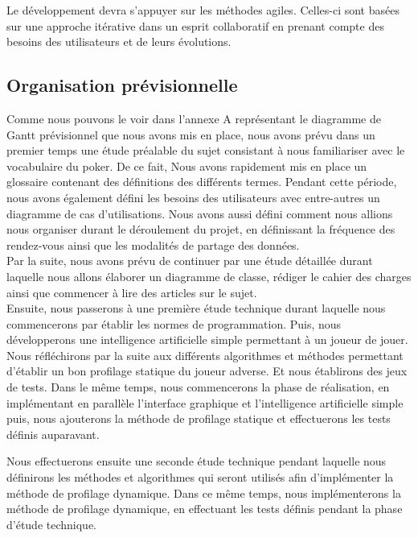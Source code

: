 \documentclass{report}
\begin{document}
Le développement devra s'appuyer sur les méthodes agiles. Celles-ci sont basées sur une approche itérative dans un esprit collaboratif en prenant compte des besoins des utilisateurs et de leurs évolutions.\par

\subsection{Organisation prévisionnelle}

\hspace{0.5cm}Comme nous pouvons le voir dans l'annexe A représentant le diagramme de Gantt prévisionnel que nous avons mis en place, nous avons prévu dans un premier temps une étude préalable du sujet consistant à nous familiariser avec le vocabulaire du poker. De ce fait, Nous avons rapidement mis en place un glossaire contenant des définitions des différents termes. Pendant cette période, nous avons également défini les besoins des utilisateurs avec entre-autres un diagramme de cas d'utilisations. Nous avons aussi défini comment nous allions nous organiser durant le déroulement du projet, en définissant la fréquence des rendez-vous ainsi que les modalités de partage des données.\\

Par la suite, nous avons prévu de continuer par une étude détaillée durant laquelle nous allons élaborer un diagramme de classe, rédiger le cahier des charges ainsi que commencer à lire des articles sur le sujet.\\

Ensuite, nous passerons à une première étude technique durant laquelle nous commencerons par établir les normes de programmation. Puis, nous développerons une intelligence artificielle simple permettant à un joueur de jouer. Nous réfléchirons par la suite aux différents algorithmes et méthodes permettant d'établir un bon profilage statique du joueur adverse. Et nous établirons des jeux de tests. Dans le même temps, nous commencerons la phase de réalisation, en implémentant en parallèle l'interface graphique et l'intelligence artificielle simple puis, nous ajouterons la méthode de profilage statique et effectuerons les tests définis auparavant.\par
Nous effectuerons ensuite une seconde étude technique pendant laquelle nous définirons les méthodes et algorithmes qui seront utilisés afin d'implémenter la méthode de profilage dynamique. Dans ce même temps, nous implémenterons la méthode de profilage dynamique, en effectuant les tests définis pendant la phase d'étude technique.\\
\end{document}
